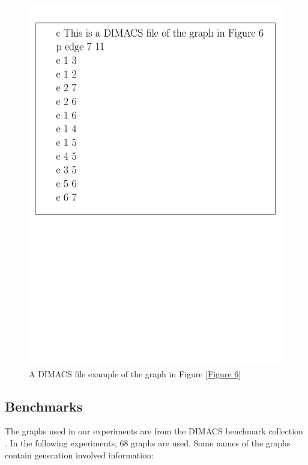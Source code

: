 \documentclass[12pt,a4paper,twoside]{scrartcl}
\numberwithin{equation}{section}
\begin{document}
\begin{figure}[h!]
\begin{center}
  \includegraphics[scale = 0.5]{1/Dimacs.pdf}
      \caption{A DIMACS file example of the graph in Figure \ref{Figure 6}}
      \end{center}
\end{figure}


\subsection{Benchmarks}
\label{benchmark}
The graphs used in our experiments are from the DIMACS benchmark collection    \cite {graph1, graph2}. In the following experiments, 68 graphs are used. Some names of the graphs contain generation involved information:\\
\end{document}
